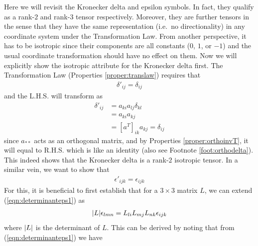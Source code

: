 Here we will revisit the Kronecker delta and epsilon symbols. In fact, they qualify as a rank-$2$ and rank-$3$ tensor respectively. Moreover, they are further  tensors in the sense that they have the same representation (i.e.\ no directionality) in any coordinate system under the Transformation Law. From another perspective, it has to be isotropic since their components are all constants ($0$, $1$, or $-1$) and the usual coordinate transformation should have no effect on them. Now we will explicitly show the isotropic attribute for the Kronecker delta first. The Transformation Law (Properties \ref{proper:translaw}) requires that
\begin{align}
\delta'_{ij} = \delta_{ij}
\end{align}
and the L.H.S. will transform as
\begin{align*}
\delta'_{ij} &= a_{ki}a_{lj}\delta_{kl} \\
&= a_{ki}a_{kj} \\
&= [a^T]_{ik}a_{kj} = \delta_{ij}
\end{align*}
since $a_{**}$ acts as an orthogonal matrix, and by Properties \ref{proper:orthoinvT}, it will equal to R.H.S. which is like an identity (also see Footnote \ref{foot:orthodelta}). This indeed shows that the Kronecker delta is a rank-$2$ isotropic tensor. In a similar vein, we want to show that
\begin{align}
\epsilon'_{ijk} = \epsilon_{ijk}
\end{align}
For this, it is beneficial to first establish that for a $3 \times 3$ matrix $L$, we can extend (\ref{eqn:determinanteps1}) as
\begin{align}
\abs{L}\epsilon_{lmn} = L_{li}L_{mj}L_{nk}\epsilon_{ijk} \label{eqn:determinanteps2}
\end{align}
where $\abs{L}$ is the determinant of $L$. This can be derived by noting that from (\ref{eqn:determinanteps1}) we have
